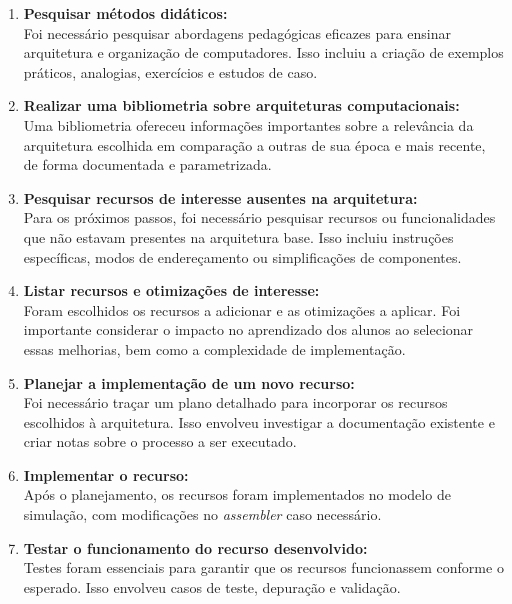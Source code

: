 \documentclass[
	12pt,				%
	openright,			%
	oneside,			%
	a4paper,			%
	english,			%
	french,				%
	spanish,			%
	brazil,				%
	]{abntex2}
\begin{document}
\begin{enumerate}[label=\textbf{\arabic*.}]
    \item \textbf{Pesquisar métodos didáticos:} \\
    Foi necessário pesquisar abordagens pedagógicas eficazes para ensinar arquitetura e organização de computadores. Isso incluiu a criação de exemplos práticos, analogias, exercícios e estudos de caso.

    \item  \textbf{Realizar uma bibliometria sobre arquiteturas computacionais:}\\
    Uma bibliometria ofereceu informações importantes sobre a relevância da arquitetura escolhida em comparação a outras de sua época e mais recente, de forma documentada e parametrizada.

    \item \textbf{Pesquisar recursos de interesse ausentes na arquitetura:} \\
    Para os próximos passos, foi necessário pesquisar recursos ou funcionalidades que não estavam presentes na arquitetura base. Isso incluiu instruções específicas, modos de endereçamento ou simplificações de componentes.

    \item \textbf{Listar recursos e otimizações de interesse:} \\
    Foram escolhidos os recursos a adicionar e as otimizações a aplicar. Foi importante considerar o impacto no aprendizado dos alunos ao selecionar essas melhorias, bem como a complexidade de implementação.

    \item \textbf{Planejar a implementação de um novo recurso:} \\
    Foi necessário traçar um plano detalhado para incorporar os recursos escolhidos à arquitetura. Isso envolveu investigar a documentação existente e criar notas sobre o processo a ser executado.

    \item \textbf{Implementar o recurso:} \\
    Após o planejamento, os recursos foram implementados no modelo de simulação, com modificações no \textit{assembler} caso necessário.

    \item \textbf{Testar o funcionamento do recurso desenvolvido:} \\
    Testes foram essenciais para garantir que os recursos funcionassem conforme o esperado. Isso envolveu casos de teste, depuração e validação.


\end{enumerate}
\end{document}
